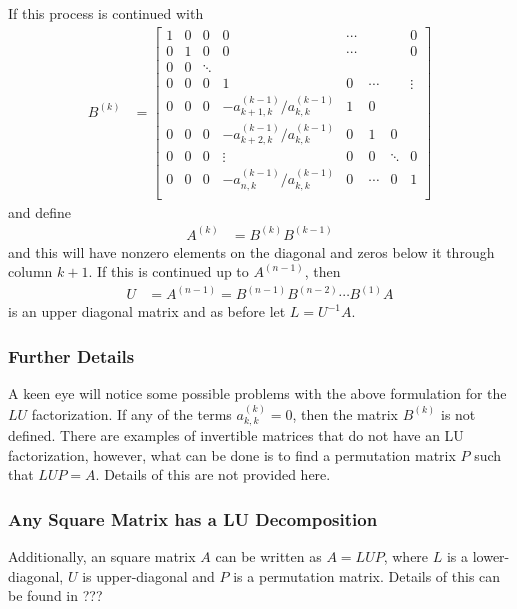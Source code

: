 If this process is continued with 
%
\begin{align*}
B^{(k)} & = \begin{bmatrix}
1 & 0 & 0 & 0 & \cdots & & & 0  \\
0 & 1 & 0 & 0 & \cdots & & & 0  \\
0 & 0 & \ddots \\
0 & 0 & 0 & 1 & 0 & \cdots & & \vdots \\
0 & 0 & 0 & -a^{(k-1)}_{k+1,k}/a^{(k-1)}_{k,k} & 1 & 0 \\
0 & 0 & 0 & -a^{(k-1)}_{k+2,k}/a^{(k-1)}_{k,k} & 0 & 1 & 0 \\
0 & 0 & 0 & \vdots & 0 & 0 & \ddots & 0 \\
0 & 0 & 0 & -a^{(k-1)}_{n,k}/a^{(k-1)}_{k,k} & 0 & \cdots & 0 & 1 \\
\end{bmatrix}
\end{align*}
and define
\begin{align*}
A^{(k)} & = B^{(k)} B^{(k-1)} 
\end{align*}
and this will have nonzero elements on the diagonal and zeros below it through column $k+1$.  
If this is continued up to $A^{(n-1)}$, then 
\begin{align*}
U & = A^{(n-1)} = B^{(n-1)}B^{(n-2)} \cdots B^{(1)} A
\end{align*}
is an upper diagonal matrix and as before let $L = U^{-1} A$. 

\subsubsection{Further Details}

A keen eye will notice some possible problems with the above formulation for the $LU$ factorization.  If any of the terms $a^{(k)}_{k,k} = 0$, then the matrix $B^{(k)}$ is not defined.   There are examples of invertible matrices that do not have an LU factorization, however, what can be done is to find a permutation matrix $P$ such that $LUP=A$.  Details of this are not provided here. 

\subsubsection{Any Square Matrix has a LU Decomposition}

Additionally, an square matrix $A$ can be written as $A=LUP$, where $L$ is a lower-diagonal, $U$ is upper-diagonal and $P$ is a permutation matrix.  Details of this can be found in ???

